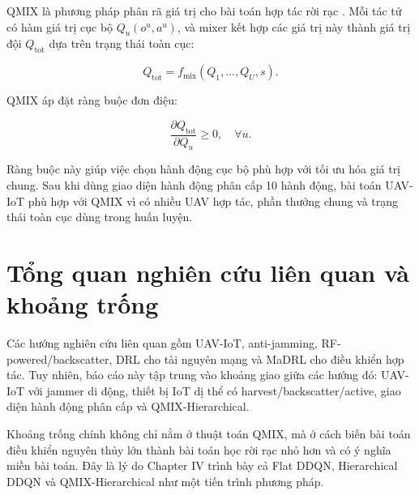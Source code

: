 QMIX là phương pháp phân rã giá trị cho bài toán hợp tác rời rạc \cite{rashid2018qmix}. Mỗi tác tử có hàm giá trị cục bộ \(Q_u(o^u,a^u)\), và mixer kết hợp các giá trị này thành giá trị đội \(Q_{\mathrm{tot}}\) dựa trên trạng thái toàn cục:

\begin{equation}
Q_{\mathrm{tot}}=f_{\mathrm{mix}}(Q_1,\ldots,Q_U,s).
\label{eq:background_qmix}
\end{equation}

QMIX áp đặt ràng buộc đơn điệu:

\begin{equation}
\frac{\partial Q_{\mathrm{tot}}}{\partial Q_u}\ge 0,\quad \forall u.
\label{eq:background_monotonic}
\end{equation}

Ràng buộc này giúp việc chọn hành động cục bộ phù hợp với tối ưu hóa giá trị chung. Sau khi dùng giao diện hành động phân cấp 10 hành động, bài toán UAV-IoT phù hợp với QMIX vì có nhiều UAV hợp tác, phần thưởng chung và trạng thái toàn cục dùng trong huấn luyện.

\section{Tổng quan nghiên cứu liên quan và khoảng trống}

Các hướng nghiên cứu liên quan gồm UAV-IoT, anti-jamming, RF-powered/backscatter, DRL cho tài nguyên mạng và MaDRL cho điều khiển hợp tác. Tuy nhiên, báo cáo này tập trung vào khoảng giao giữa các hướng đó: UAV-IoT với jammer di động, thiết bị IoT dị thể có harvest/backscatter/active, giao diện hành động phân cấp và QMIX-Hierarchical.

Khoảng trống chính không chỉ nằm ở thuật toán QMIX, mà ở cách biến bài toán điều khiển nguyên thủy lớn thành bài toán học rời rạc nhỏ hơn và có ý nghĩa miền bài toán. Đây là lý do Chapter IV trình bày cả Flat DDQN, Hierarchical DDQN và QMIX-Hierarchical như một tiến trình phương pháp.

